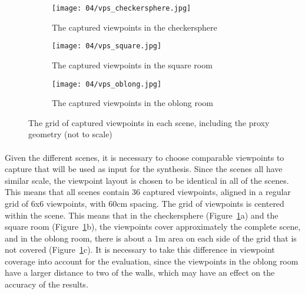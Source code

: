 \begin{figure}
\centering
    \hfill
    \begin{subfigure}[b]{0.4\textwidth}
            \centering
            \texttt{[image: 04/vps\_checkersphere.jpg]}
            \caption{The captured viewpoints in the checkersphere}
    \end{subfigure}
    \hfill
    \begin{subfigure}[b]{0.4\textwidth}
            \centering
            \texttt{[image: 04/vps\_square.jpg]}
            \caption{The captured viewpoints in the square room}
    \end{subfigure}
    \hfill
    \hfill

    \hfill
    \begin{subfigure}[b]{0.4\textwidth}
            \centering
            \texttt{[image: 04/vps\_oblong.jpg]}
            \caption{The captured viewpoints in the oblong room}
    \end{subfigure}
    \hfill
    \hfill
  \caption[The grid of captured viewpoints in each scene, including the proxy geometry]{The grid of captured viewpoints in each scene, including the proxy geometry (not to scale)} \label{fig:vps_grid}
\end{figure}

\paragraph{}
Given the different scenes, it is necessary to choose comparable viewpoints to capture that will be used as input for the synthesis. Since the scenes all have similar scale, the viewpoint layout is chosen to be identical in all of the scenes. This means that all scenes contain 36 captured viewpoints, aligned in a regular grid of 6x6 viewpoints, with 60cm spacing. The grid of viewpoints is centered within the scene. This means that in the checkersphere (Figure~\ref{fig:vps_grid}a) and the square room (Figure~\ref{fig:vps_grid}b), the viewpoints cover approximately the complete scene, and in the oblong room, there is about a 1m area on each side of the grid that is not covered (Figure~\ref{fig:vps_grid}c). It is necessary to take this difference in viewpoint coverage into account for the evaluation, since the viewpoints in the oblong room have a larger distance to two of the walls, which may have an effect on the accuracy of the results.

